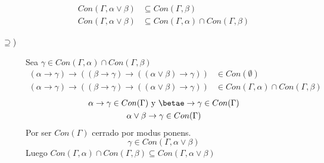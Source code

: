 \begin{ejercicio}
\begin{description}
\begin{align*}
                    Con(\Gamma,\alpha\lor\beta) &\subseteq Con(\Gamma,\beta) \\
                    Con(\Gamma,\alpha\lor\beta) &\subseteq Con(\Gamma,\alpha)\cap Con(\Gamma,\beta)
                \end{align*}
        \item [$\supseteq$)] Sea $\gamma\in Con(\Gamma,\alpha)\cap Con(\Gamma,\beta)$
            \begin{align*}
                (\alpha\rightarrow\gamma)\rightarrow((\beta\rightarrow\gamma)\rightarrow((\alpha\lor\beta)\rightarrow\gamma))&\in Con(\emptyset ) \\
                (\alpha\rightarrow\gamma)\rightarrow((\beta\rightarrow\gamma)\rightarrow((\alpha\lor\beta)\rightarrow\gamma)) &\in  Con(\Gamma,\alpha) \cap Con(\Gamma,\beta)
            \end{align*}
            \begin{gather*}
                \alpha\rightarrow\gamma\in Con(\Gamma) \text{\ y\ } \betae\rightarrow\gamma\in Con(\Gamma) \\
                \alpha\lor\beta\rightarrow\gamma\in Con(\Gamma)
            \end{gather*}
            Por ser $Con(\Gamma)$ cerrado por modus ponens.
            \begin{equation*}
                \gamma\in Con(\Gamma,\alpha\lor\beta)
            \end{equation*}
            Luego $Con(\Gamma,\alpha)\cap Con(\Gamma,\beta)\subseteq Con(\Gamma,\alpha\lor\beta)$
    \end{description}
\end{ejercicio}


